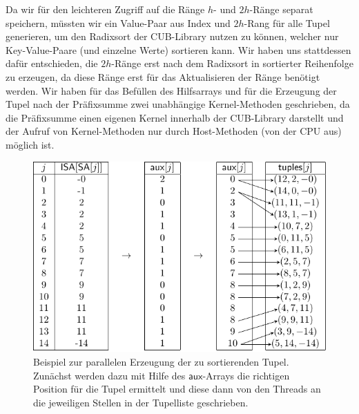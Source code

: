 Da wir für den leichteren Zugriff auf die Ränge $h$- und $2h$-Ränge separat speichern, müssten wir ein Value-Paar aus Index und $2h$-Rang für alle Tupel generieren, um den Radixsort der CUB-Library nutzen zu können, welcher nur Key-Value-Paare (und einzelne Werte) sortieren kann. Wir haben uns stattdessen dafür entschieden, die $2h$-Ränge erst nach dem Radixsort in sortierter Reihenfolge zu erzeugen, da diese Ränge erst für das Aktualisieren der Ränge benötigt werden. Wir haben für das Befüllen des Hilfsarrays und für die Erzeugung der Tupel nach der Präfixsumme zwei unabhängige Kernel-Methoden geschrieben, da die Präfixsumme einen eigenen Kernel innerhalb der CUB-Library darstellt und der Aufruf von Kernel-Methoden nur durch Host-Methoden (von der CPU aus) möglich ist. 
\begin{center}
\begin{figure}
\includegraphics[scale=1]{kapitel/saca_algorithmen/osipov/create_tuple_example.pdf}
\caption{Beispiel zur parallelen Erzeugung der zu sortierenden Tupel. Zunächst werden dazu mit Hilfe des $\mathsf{aux}$-Arrays die richtigen Position für die Tupel ermittelt und diese dann von den Threads an die jeweiligen Stellen in der Tupelliste geschrieben.}
\end{figure}

\end{center}

